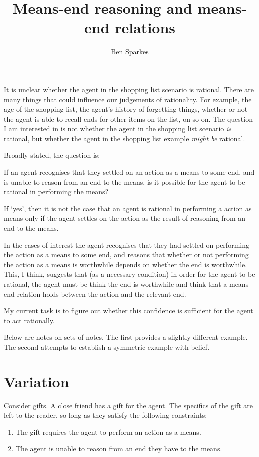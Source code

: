 \documentclass[10pt]{article}
\title{Means-end reasoning and means-end relations}
\author{Ben Sparkes}
\begin{document}
It is unclear whether the agent in the shopping list scenario is rational.
There are many things that could influence our judgements of rationality.
For example, the age of the shopping list, the agent's history of forgetting things, whether or not the agent is able to recall ends for other items on the list, on so on.
The question I am interested in is not whether the agent in the shopping list scenario \emph{is} rational, but whether the agent in the shopping list example \emph{might be} rational.

Broadly stated, the question is:

If an agent recognises that they settled on an action as a means to some end, and is unable to reason from an end to the means, is it possible for the agent to be rational in performing the means?

If `yes', then it is not the case that an agent is rational in performing a action as means only if the agent settles on the action as the result of reasoning from an end to the means.

In the cases of interest the agent recognises that they had settled on performing the action as a means to some end, and reasons that whether or not performing the action as a means is worthwhile depends on whether the end is worthwhile.
This, I think, suggests that (as a necessary condition) in order for the agent to be rational, the agent must be think the end is worthwhile and think that a means-end relation holds between the action and the relevant end.

My current task is to figure out whether this confidence is sufficient for the agent to act rationally.



Below are notes on sets of notes.
The first provides a slightly different example.
The second attempts to establish a symmetric example with belief.

\section{Variation}
\label{sec:variation}

Consider gifts.
A close friend has a gift for the agent.
The specifics of the gift are left to the reader, so long as they satisfy the following constraints:
\begin{enumerate}
\item\label{gift:means} The gift requires the agent to perform an action as a means.
\item\label{gift:relation} The agent is unable to reason from an end they have to the means.
\end{enumerate}
\end{document}
